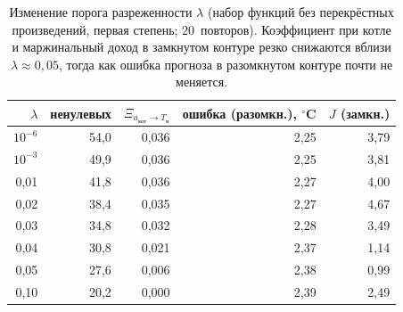 \documentclass[12pt,a4paper,leqno]{article}
\newcommand{\Tin}{T_{\text{в}}}          %
\newcommand{\uBoil}{u_{\text{кот}}}       %
\begin{document}
\begin{table}[t]
\centering
\caption{Изменение порога разреженности $\lambda$ (набор функций без перекрёстных
произведений, первая степень; 20~повторов). Коэффициент при котле и маржинальный доход в замкнутом
контуре резко снижаются вблизи $\lambda\approx0{,}05$, тогда как ошибка прогноза в
разомкнутом контуре почти не меняется.}
\label{tab:lambda}
\small
\begin{tabular}{@{}rrrrr@{}}
\toprule
$\lambda$ & ненулевых & $\Xi_{\uBoil\to \Tin}$ & ошибка (разомкн.), $^\circ$C & $J$ (замкн.) \\
\midrule
$10^{-6}$ & 54,0 & 0,036 & 2,25 & 3,79 \\
$10^{-3}$ & 49,9 & 0,036 & 2,25 & 3,81 \\
0,01 & 41,8 & 0,036 & 2,27 & 4,00 \\
0,02 & 38,4 & 0,035 & 2,27 & 4,67 \\
0,03 & 34,8 & 0,032 & 2,28 & 3,49 \\
0,04 & 30,8 & 0,021 & 2,37 & 1,14 \\
0,05 & 27,6 & 0,006 & 2,38 & 0,99 \\
0,10 & 20,2 & 0,000 & 2,39 & 2,49 \\
\bottomrule
\end{tabular}
\end{table}
\end{document}
